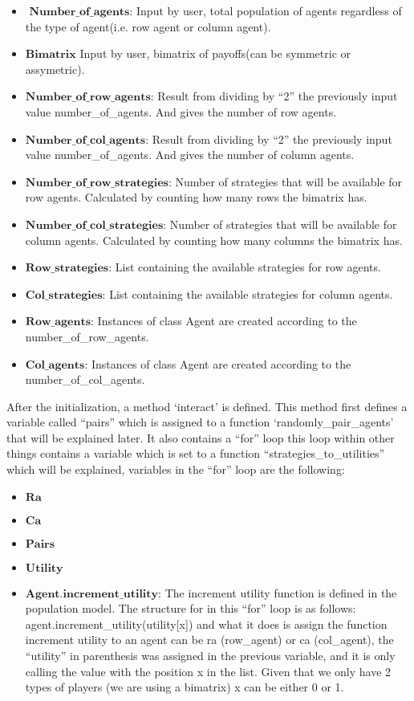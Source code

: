 \documentclass{article}
\begin{document}
\begin{itemize}
\item $\textbf{ Number\_of\_agents:}$ Input by user, total population of agents regardless of the type of agent(i.e. row agent or column agent).
\item $\textbf{Bimatrix}$ Input by user, bimatrix of payoffs(can be symmetric or assymetric).
\item $\textbf{Number\_of\_row\_agents:}$ Result from dividing by “2” the previously input value number\_of\_agents. And gives the number of row agents.
\item $\textbf{Number\_of\_col\_agents:}$ Result from dividing by “2” the previously input value number\_of\_agents. And gives the number of column agents.
\item $\textbf{Number\_of\_row\_strategies:}$ Number of strategies that will be available for row agents. Calculated by counting how many rows the bimatrix has.
\item $\textbf{Number\_of\_col\_strategies:}$ Number of strategies that will be available for column agents. Calculated by counting how many columns the bimatrix has.
\item $\textbf{Row\_strategies:}$ List containing the available strategies for row agents.
\item $\textbf{Col\_strategies:}$ List containing the available strategies for column agents.
\item $\textbf{Row\_agents:}$ Instances of class Agent are created according to the number\_of\_row\_agents.
\item $\textbf{Col\_agents:}$ Instances of class Agent are created according to the number\_of\_col\_agents.
\end{itemize}

After the initialization, a method ‘interact’ is defined. This method first defines a variable called “pairs” which is assigned to a function ‘randomly\_pair\_agents’ that will be explained later. It also contains a “for” loop this loop within other things contains a variable which is set to a function “strategies\_to\_utilities” which will be explained, variables in the “for” loop are the following:

\begin{itemize}
\item $\textbf{Ra}$
\item $\textbf{Ca}$
\item $\textbf{Pairs}$
\item $\textbf{Utility}$
\item $\textbf{Agent.increment\_utility}$: The increment utility function is defined in the population model. The structure for in this “for” loop is as follows:
\\ agent.increment\_utility(utility[x]) and what it does is assign the function increment utility to an agent can be ra (row\_agent) or ca (col\_agent), the “utility” in parenthesis was assigned in the previous variable, and it is only calling the value with the position x in the list. Given that we only have 2 types of players (we are using a bimatrix) x can be either 0 or 1.
\end{itemize}
\end{document}
